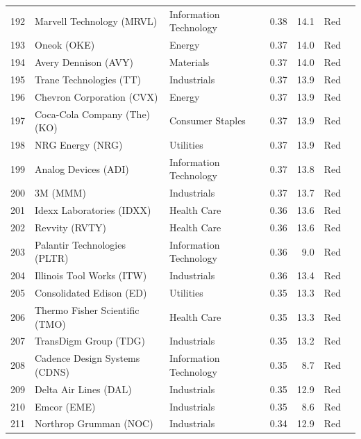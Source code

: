 \documentclass[11pt,a4paper]{article}
\begin{document}
{\begin{longtable}{r p{4.4cm} p{2.8cm} r r l l}
192 & Marvell Technology (MRVL) & Information Technology & 0.38 & 14.1 & \cellcolor[HTML]{F4B6B6}Red &  \\
193 & Oneok (OKE) & Energy & 0.37 & 14.0 & \cellcolor[HTML]{F4B6B6}Red &  \\
194 & Avery Dennison (AVY) & Materials & 0.37 & 14.0 & \cellcolor[HTML]{F4B6B6}Red &  \\
195 & Trane Technologies (TT) & Industrials & 0.37 & 13.9 & \cellcolor[HTML]{F4B6B6}Red &  \\
196 & Chevron Corporation (CVX) & Energy & 0.37 & 13.9 & \cellcolor[HTML]{F4B6B6}Red &  \\
197 & Coca-Cola Company (The) (KO) & Consumer Staples & 0.37 & 13.9 & \cellcolor[HTML]{F4B6B6}Red &  \\
198 & NRG Energy (NRG) & Utilities & 0.37 & 13.9 & \cellcolor[HTML]{F4B6B6}Red &  \\
199 & Analog Devices (ADI) & Information Technology & 0.37 & 13.8 & \cellcolor[HTML]{F4B6B6}Red &  \\
200 & 3M (MMM) & Industrials & 0.37 & 13.7 & \cellcolor[HTML]{F4B6B6}Red &  \\
201 & Idexx Laboratories (IDXX) & Health Care & 0.36 & 13.6 & \cellcolor[HTML]{F4B6B6}Red &  \\
202 & Revvity (RVTY) & Health Care & 0.36 & 13.6 & \cellcolor[HTML]{F4B6B6}Red &  \\
203 & Palantir Technologies (PLTR) & Information Technology & 0.36 & 9.0 & \cellcolor[HTML]{F4B6B6}Red &  \\
204 & Illinois Tool Works (ITW) & Industrials & 0.36 & 13.4 & \cellcolor[HTML]{F4B6B6}Red &  \\
205 & Consolidated Edison (ED) & Utilities & 0.35 & 13.3 & \cellcolor[HTML]{F4B6B6}Red &  \\
206 & Thermo Fisher Scientific (TMO) & Health Care & 0.35 & 13.3 & \cellcolor[HTML]{F4B6B6}Red &  \\
207 & TransDigm Group (TDG) & Industrials & 0.35 & 13.2 & \cellcolor[HTML]{F4B6B6}Red &  \\
208 & Cadence Design Systems (CDNS) & Information Technology & 0.35 & 8.7 & \cellcolor[HTML]{F4B6B6}Red &  \\
209 & Delta Air Lines (DAL) & Industrials & 0.35 & 12.9 & \cellcolor[HTML]{F4B6B6}Red &  \\
210 & Emcor (EME) & Industrials & 0.35 & 8.6 & \cellcolor[HTML]{F4B6B6}Red &  \\
211 & Northrop Grumman (NOC) & Industrials & 0.34 & 12.9 & \cellcolor[HTML]{F4B6B6}Red &  \\

\end{longtable}}
\end{document}
